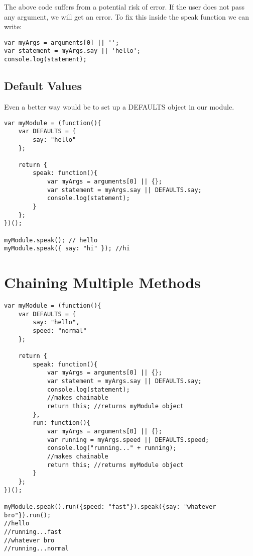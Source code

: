 \documentclass[12pt, a4paper]{article}
\begin{document}
The above code suffers from a potential risk of error.
If the user does not pass any argument, we will get an error.
To fix this inside the speak function we can write:
\begin{verbatim}
var myArgs = arguments[0] || '';
var statement = myArgs.say || 'hello';
console.log(statement);
\end{verbatim}
\subsection{Default Values}
Even a better way would be to set up a DEFAULTS object in our module.
\begin{verbatim}
var myModule = (function(){
    var DEFAULTS = {
        say: "hello"
    };

    return {
        speak: function(){
            var myArgs = arguments[0] || {};
            var statement = myArgs.say || DEFAULTS.say; 
            console.log(statement);
        }
    };
})();

myModule.speak(); // hello
myModule.speak({ say: "hi" }); //hi
\end{verbatim}

\section{Chaining Multiple Methods}
\begin{verbatim}
var myModule = (function(){
    var DEFAULTS = {
        say: "hello",
        speed: "normal"
    };

    return {
        speak: function(){
            var myArgs = arguments[0] || {};
            var statement = myArgs.say || DEFAULTS.say; 
            console.log(statement);
            //makes chainable
            return this; //returns myModule object
        },
        run: function(){
            var myArgs = arguments[0] || {};
            var running = myArgs.speed || DEFAULTS.speed;   
            console.log("running..." + running);
            //makes chainable
            return this; //returns myModule object
        }
    };
})();

myModule.speak().run({speed: "fast"}).speak({say: "whatever bro"}).run();
//hello
//running...fast
//whatever bro
//running...normal
\end{verbatim}
\end{document}
